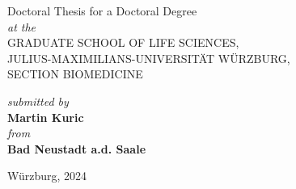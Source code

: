 \begin{titlepage}
\begin{center}
        \vspace{\vfull}
        {\large Doctoral Thesis for a Doctoral Degree } \\
        \vspace{\vhalf}
        \textit{at the} \\
        \vspace{\vhalf}
        \MakeUppercase{Graduate School of Life Sciences, \\
            Julius-Maximilians-Universität Würzburg, \\
            Section Biomedicine}


        \vspace{\vhalf}
        \textit{submitted by} \\
        \vspace{\vhalf}
        {\Large \textbf{Martin Kuric}} \\
        \vspace{\vhalf}
        \textit{from} \\
        \vspace{\vhalf}
        \textbf{Bad Neustadt a.d. Saale}

        \vfill
        Würzburg, {\large 2024}

    \end{center}
\end{titlepage}
\thispagestyle{empty}   %


\newpage

\blankpage




\vspace*{\fill} %

